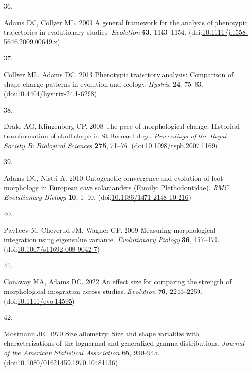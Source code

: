 \documentclass[
  11pt,
]{article}
\newlength{\cslhangindent}
\newlength{\csllabelwidth}
\newlength{\cslentryspacingunit} %
\newenvironment{CSLReferences}[2] %
 {%
  \setlength{\parindent}{0pt}
  \ifodd #1
  \let\oldpar\par
  \def\par{\hangindent=\cslhangindent\oldpar}
  \fi
  \setlength{\parskip}{#2\cslentryspacingunit}
 }%
 {}
\newcommand{\CSLLeftMargin}[1]{\parbox[t]{\csllabelwidth}{#1}}
\newcommand{\CSLRightInline}[1]{\parbox[t]{\linewidth - \csllabelwidth}{#1}\break}
\begin{document}
\begin{CSLReferences}{0}{0}
\leavevmode{}%
\CSLLeftMargin{36. }%
\CSLRightInline{Adams DC, Collyer ML. 2009 A general framework for the
analysis of phenotypic trajectories in evolutionary studies.
\emph{Evolution} \textbf{63}, 1143--1154.
(doi:\href{https://doi.org/10.1111/j.1558-5646.2009.00649.x}{10.1111/j.1558-5646.2009.00649.x})}

\leavevmode{}%
\CSLLeftMargin{37. }%
\CSLRightInline{Collyer ML, Adams DC. 2013 Phenotypic trajectory
analysis: Comparison of shape change patterns in evolution and ecology.
\emph{Hystrix} \textbf{24}, 75--83.
(doi:\href{https://doi.org/10.4404/hystrix-24.1-6298}{10.4404/hystrix-24.1-6298})}

\leavevmode{}%
\CSLLeftMargin{38. }%
\CSLRightInline{Drake AG, Klingenberg CP. 2008 The pace of morphological
change: Historical transformation of skull shape in {S}t {B}ernard dogs.
\emph{Proceedings of the Royal Society B: Biological Sciences}
\textbf{275}, 71--76.
(doi:\href{https://doi.org/10.1098/rspb.2007.1169}{10.1098/rspb.2007.1169})}

\leavevmode{}%
\CSLLeftMargin{39. }%
\CSLRightInline{Adams DC, Nistri A. 2010 Ontogenetic convergence and
evolution of foot morphology in {E}uropean cave salamanders ({F}amily:
{P}lethodontidae). \emph{BMC Evolutionary Biology} \textbf{10}, 1--10.
(doi:\href{https://doi.org/10.1186/1471-2148-10-216}{10.1186/1471-2148-10-216})}

\leavevmode{}%
\CSLLeftMargin{40. }%
\CSLRightInline{Pavlicev M, Cheverud JM, Wagner GP. 2009 Measuring
morphological integration using eigenvalue variance. \emph{Evolutionary
Biology} \textbf{36}, 157--170.
(doi:\href{https://doi.org/10.1007/s11692-008-9042-7}{10.1007/s11692-008-9042-7})}

\leavevmode{}%
\CSLLeftMargin{41. }%
\CSLRightInline{Conaway MA, Adams DC. 2022 An effect size for comparing
the strength of morphological integration across studies.
\emph{Evolution} \textbf{76}, 2244--2259.
(doi:\href{https://doi.org/10.1111/evo.14595}{10.1111/evo.14595})}

\leavevmode{}%
\CSLLeftMargin{42. }%
\CSLRightInline{Mosimann JE. 1970 Size allometry: Size and shape
variables with characterizations of the lognormal and generalized gamma
distributions. \emph{Journal of the American Statistical Association}
\textbf{65}, 930--945.
(doi:\href{https://doi.org/10.1080/01621459.1970.10481136}{10.1080/01621459.1970.10481136})}


\end{CSLReferences}
\end{document}

